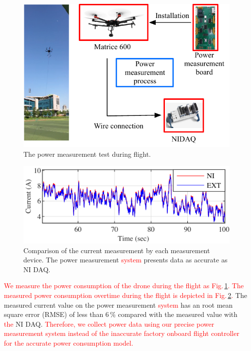 \documentclass[journal]{./template/IEEEtran}
\begin{document}
\begin{figure}[ht]
\centering
\includegraphics[scale=0.825]{fig3/flight_experiment.pdf}
\caption{The power measurement test during flight.}
\label{fig:flight_test}
\end{figure}

\begin{figure}[ht]
\centering
\includegraphics[scale=1.0]{fig4/flight_exp_result.pdf}
\caption{Comparison of the current measurement by each measurement device. The power measurement \textcolor{red}{system} presents data as accurate as NI DAQ.}
\label{fig:flight_result}
\end{figure}

\noindent\textcolor{red}{We measure the power consumption of the drone during the flight as Fig.\,\ref{fig:flight_test}. The measured power consumption overtime during the flight is depicted in Fig.\,\ref{fig:flight_result}.}
The measured current value on the power measurement \textcolor{red}{system} has an root mean square error (RMSE) of less than 6\,\% compared with the measured value with \textcolor{red}{the} NI DAQ. 
\textcolor{red}{Therefore, we collect power data using our precise power measurement system instead of the inaccurate factory onboard flight controller for the accurate power consumption model.}
\end{document}

